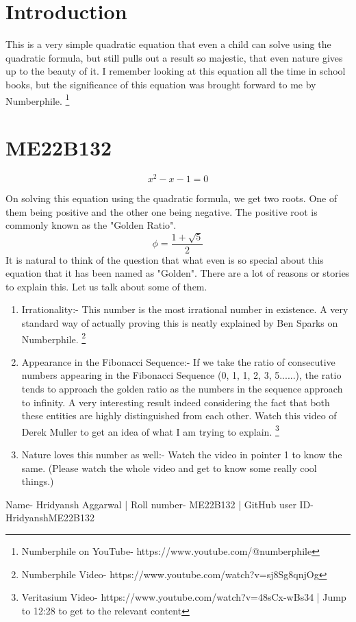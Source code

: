 \section{Introduction}

This is a very simple quadratic equation that even a child can solve using the quadratic formula, but still pulls out a result so majestic, that even nature gives up to the beauty of it. I remember looking at this equation all the time in school books, but the significance of this equation was brought forward to me by Numberphile. \footnote{Numberphile on YouTube- https://www.youtube.com/@numberphile}

\section{ME22B132}

\begin{equation}
    x^2-x-1=0
\end{equation}

On solving this equation using the quadratic formula, we get two roots. One of them being positive and the other one being negative. The positive root is commonly known as the "Golden Ratio".
\begin{equation}
    \phi = \frac{1+\sqrt{5}}{2}
\end{equation}
It is natural to think of the question that what even is so special about this equation that it has been named as "Golden".
There are a lot of reasons or stories to explain this. Let us talk about some of them.
\begin{enumerate}
    \item Irrationality:- This number is the most irrational number in existence. A very standard way of actually proving this is neatly explained by Ben Sparks on Numberphile. \footnote{Numberphile Video- https://www.youtube.com/watch?v=sj8Sg8qnjOg}
    \item Appearance in the Fibonacci Sequence:- If we take the ratio of consecutive numbers appearing in the Fibonacci Sequence (0, 1, 1, 2, 3, 5......), the ratio tends to approach the golden ratio as the numbers in the sequence approach to infinity. A very interesting result indeed considering the fact that both these entities are highly distinguished from each other. Watch this video of Derek Muller to get an idea of what I am trying to explain. \footnote{Veritasium Video- https://www.youtube.com/watch?v=48sCx-wBs34 | Jump to 12:28 to get to the relevant content}
    \item Nature loves this number as well:- Watch the video in pointer 1 to know the same. (Please watch the whole video and get to know some really cool things.)
\end{enumerate}
Name- Hridyansh Aggarwal | Roll number- ME22B132 | GitHub user ID- HridyanshME22B132
